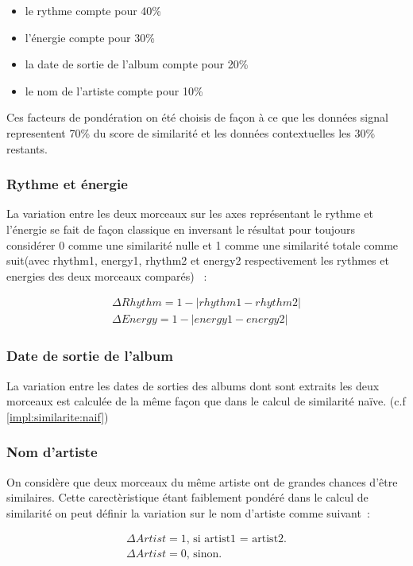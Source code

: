 \begin{itemize}
\item le rythme compte pour 40\%
\item l'énergie compte pour 30\%
\item la date de sortie de l'album compte pour 20\%
\item le nom de l'artiste compte pour 10\%
\end{itemize}

Ces facteurs de pondération on été choisis de façon à ce que les données signal representent 70\% du score de similarité et les données contextuelles les 30\% restants.

\subsubsection{Rythme et énergie}
\label{impl:similarite:complet:rhythm}

La variation entre les deux morceaux sur les axes représentant le rythme et l'énergie se fait de façon classique en inversant le résultat pour toujours considérer 0 comme une similarité nulle et 1 comme une similarité totale comme suit(avec rhythm1, energy1, rhythm2 et energy2 respectivement les rythmes et energies des deux morceaux comparés) ~:

\begin{align}
  \Delta Rhythm = 1 - |rhythm1 - rhythm2|\\
  \Delta Energy = 1 - |energy1 - energy2|
\end{align}

\subsubsection{Date de sortie de l'album}
\label{impl:similarite:complet:date}

La variation entre les dates de sorties des albums dont sont extraits les deux morceaux est calculée de la même façon que dans le calcul de similarité naïve. (c.f \ref{impl:similarite:naif})

\subsubsection{Nom d'artiste}
\label{impl:similarite:complet:name}

On considère que deux morceaux du même artiste ont de grandes chances d'être similaires. Cette carectèristique étant faiblement pondéré dans le calcul de similarité on peut définir la variation sur le nom d'artiste comme suivant~:

\begin{align}
  \Delta Artist = \text{1, si artist1 = artist2.}\\
  \Delta Artist = \text{0, sinon.}
\end{align}
